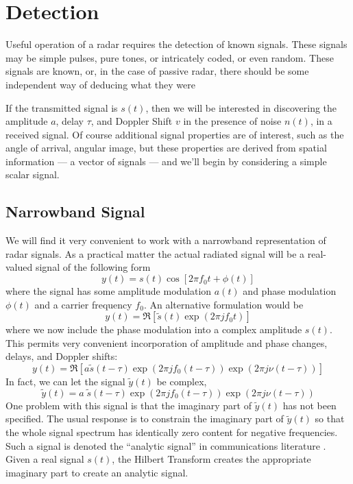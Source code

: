 
\chapter{Detection}

Useful operation of a radar requires the detection of known signals.
These signals may be simple pulses, pure tones, or intricately coded,
or even random.  These signals are known, or, in the case of passive
radar, there should be some independent way of deducing what they were 

If the transmitted signal is $s(t)$, then we will be interested in
discovering the amplitude $a$, delay $\tau$, and Doppler Shift $v$ in
the presence of noise $n(t)$, in a received signal.  Of course
additional signal properties are of interest, such as the angle of
arrival, angular image, but these properties are derived from spatial
information --- a vector of signals --- and we'll begin by considering
a simple scalar signal.

\section{Narrowband Signal}

We will find it very convenient to work with a narrowband
representation of radar signals.  As a practical matter the actual
radiated signal will be a real-valued signal of the following form
\begin{equation} \label{e:realmodel0}
y(t) = s(t) \cos[2 \pi f_0 t + \phi(t)]
\end{equation}
where the signal has some amplitude modulation $a(t)$ and phase
modulation $\phi(t)$ and a carrier frequency $f_0$.  An alternative
formulation would be 
\begin{equation}
y(t) = \Re\left[\tilde{s}(t) \exp(2\pi j f_0 t)\right]
\end{equation}
where we now include the phase modulation into a complex amplitude
$s(t)$.  This permits very convenient incorporation of amplitude and
phase changes, delays, and Doppler shifts:
\begin{equation}
y(t) = \Re\left[a \tilde{s}(t - \tau) \exp(2\pi j f_0 (t-\tau)) \exp(2\pi j \nu
  (t-\tau))\right]
\end{equation}
In fact, we can let the signal $\tilde{y}(t)$ be complex,
\begin{equation} \label{e:analyticmodel0}
\tilde{y}(t) = a\;\tilde{s}(t - \tau) \exp(2\pi j f_0 (t-\tau)) \exp(2\pi j \nu  (t-\tau))
\end{equation}
One problem with this signal is that the imaginary part of
$\tilde{y}(t)$ has not been specified.  The usual response is to
constrain the imaginary part of $\tilde{y}(t)$ so that the whole
signal spectrum has identically zero content for negative frequencies.
Such a signal is denoted the ``analytic signal'' in communications
literature \cite{vantrees,whalen,helstrom}.  Given a real signal
$s(t)$, the Hilbert Transform creates the appropriate imaginary part
to create an analytic signal.

